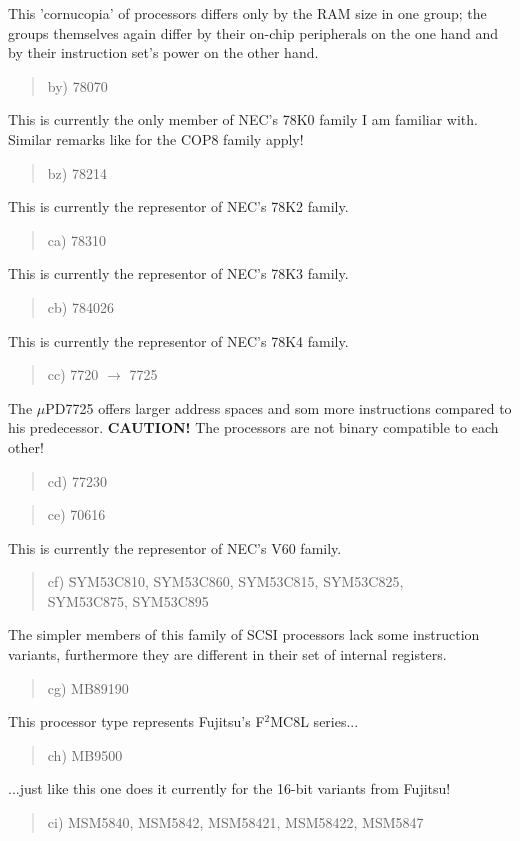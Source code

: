 \documentclass[12pt,twoside]{report}
\begin{document}
This 'cornucopia' of processors differs only by the RAM size in one
group; the groups themselves again differ by their on-chip
peripherals on the one hand and by their instruction set's power on
the other hand.
\begin{quote}
by) 78070
\end{quote}
This is currently the only member of NEC's 78K0 family I am familiar
with.  Similar remarks like for the COP8 family apply!
\begin{quote}
bz) 78214
\end{quote}
This is currently the representor of NEC's 78K2 family.
\begin{quote}
ca) 78310
\end{quote}
This is currently the representor of NEC's 78K3 family.
\begin{quote}
cb) 784026
\end{quote}
This is currently the representor of NEC's 78K4 family.
\begin{quote}
cc) 7720 $\rightarrow$ 7725
\end{quote}
The $\mu$PD7725 offers larger address spaces and som more instructions
compared to his predecessor. {\bf CAUTION!}  The processors are not binary
compatible to each other!
\begin{quote}
cd) 77230
\end{quote}
\begin{quote}
ce) 70616
\end{quote}
This is currently the representor of NEC's V60 family.
\begin{quote}
\begin{tabbing}
cf) \= SYM53C810, SYM53C860, SYM53C815, SYM53C825, \\
    \> SYM53C875, SYM53C895
\end{tabbing}
\end{quote}
The simpler members of this family of SCSI processors lack some
instruction variants, furthermore they are different in their set of
internal registers.
\begin{quote}
cg) MB89190
\end{quote}
This processor type represents Fujitsu's F$^{2}$MC8L series...
\begin{quote}
ch) MB9500
\end{quote}
...just like this one does it currently for the 16-bit variants from
Fujitsu!
\begin{quote}
ci) MSM5840, MSM5842, MSM58421, MSM58422, MSM5847
\end{quote}
\end{document}
